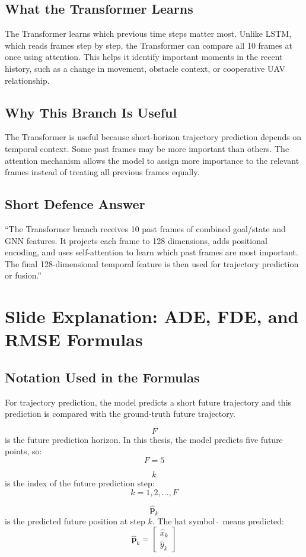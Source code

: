\documentclass[11pt,a4paper]{article}
\begin{document}
\subsection*{What the Transformer Learns}
The Transformer learns which previous time steps matter most. Unlike LSTM,
which reads frames step by step, the Transformer can compare all 10 frames at
once using attention. This helps it identify important moments in the recent
history, such as a change in movement, obstacle context, or cooperative UAV
relationship.

\subsection*{Why This Branch Is Useful}
The Transformer is useful because short-horizon trajectory prediction depends
on temporal context. Some past frames may be more important than others. The
attention mechanism allows the model to assign more importance to the relevant
frames instead of treating all previous frames equally.

\subsection*{Short Defence Answer}
``The Transformer branch receives 10 past frames of combined goal/state and GNN
features. It projects each frame to 128 dimensions, adds positional encoding,
and uses self-attention to learn which past frames are most important. The final
128-dimensional temporal feature is then used for trajectory prediction or
fusion.''

\newpage
\section*{Slide Explanation: ADE, FDE, and RMSE Formulas}

\subsection*{Notation Used in the Formulas}
For trajectory prediction, the model predicts a short future trajectory and this
prediction is compared with the ground-truth future trajectory.

\[
    F
\]
is the future prediction horizon. In this thesis, the model predicts five future
points, so:
\[
    F = 5
\]

\[
    k
\]
is the index of the future prediction step:
\[
    k = 1,2,\ldots,F
\]

\[
    \hat{\mathbf{p}}_k
\]
is the predicted future position at step \(k\). The hat symbol \(\hat{\;}\)
means predicted:
\[
    \hat{\mathbf{p}}_k =
    \begin{bmatrix}
        \hat{x}_k \\
        \hat{y}_k
    \end{bmatrix}
\]
\end{document}
